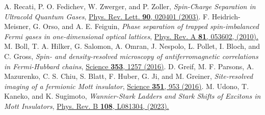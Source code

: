 \documentclass[aps,prl,showpacs,twocolumn,superscriptaddress]{revtex4-2}
\begin{document}
\begin{thebibliography}{99}
A. Recati, P. O. Fedichev, W. Zwerger, and P. Zoller,
{\it Spin-Charge Separation in Ultracold Quantum Gases},
\href{https://journals.aps.org/prl/abstract/10.1103/PhysRevLett.90.020401}{Phys. Rev. Lett. {\bf 90}, 020401 (2003)}.
 F. Heidrich-Meisner, G. Orso, and A. E. Feiguin, {\it Phase separation of trapped spin-imbalanced Fermi gases in one-dimensional optical lattices}, \href{https://doi.org/10.1103/PhysRevA.81.053602}{Phys. Rev. A {\bf 81}, 053602, (2010).}
M. Boll, T.  A. Hilker, G. Salomon, A. Omran, J. Nespolo, L. Pollet, I. Bloch, and C. Gross,
{\it Spin- and density-resolved microscopy of antiferromagnetic correlations in Fermi-Hubbard chains},
\href{https://www.science.org/doi/10.1126/science.aag1635}{Science {\bf 353}, 1257 (2016)}.
D. Greif, M. F. Parsons, A. Mazurenko, C. S. Chiu, S. Blatt, F. Huber, G. Ji, and M. Greiner,
{\it Site-resolved imaging of a fermionic Mott insulator},
\href{https://www.science.org/doi/10.1126/science.aad9041}{Science {\bf 351}, 953 (2016)}.
 M. Udono, T. Kaneko, and K. Sugimoto, {\it Wannier-Stark Ladders and Stark Shifts of Excitons in Mott Insulators}, \href{https://doi.org/10.1103/PhysRevB.108.L081304}
{Phys. Rev. B {\bf 108}, L081304, (2023).}


\end{thebibliography}
\end{document}
